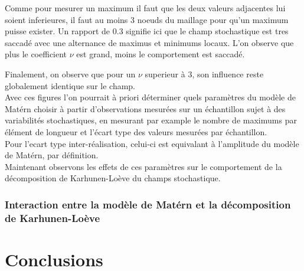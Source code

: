 \documentclass[a4paper,10pt]{article}
\begin{document}
Comme pour mesurer un maximum il faut que les deux valeurs adjacentes lui soient inferieures, il faut au moins 3 noeuds du maillage pour qu'un maximum puisse exister. Un rapport de 0.3 signifie ici que le champ stochastique est tres saccadé avec une alternance de maximus et minimums locaux. L'on observe que plus le coefficient $\nu$ est grand, moins le comportement est saccadé. \par

Finalement, on observe que pour un $\nu$ superieur à 3, son influence reste globalement identique sur le champ. \\

Avec ces figures l'on pourrait à priori déterminer quels paramètres du modèle de Matérn choisir à partir d'observations mesurées sur un échantillon sujet à des variabilités stochastiques, en mesurant par example le nombre de maximums par élément de longueur et l'écart type des valeurs mesurées par échantillon. \\ 

Pour l'ecart type inter-réalisation, celui-ci est equivalant à l'amplitude du modèle de Matérn, par définition.  \\

Maintenant observons les effets de ces paramètres sur le comportement de la décomposition de Karhunen-Loève du champs stochastique. 

\subsubsection{Interaction entre la modèle de Matérn et la décomposition de Karhunen-Loève}







\section{Conclusions}




\appendix 
\appendixpage
\addappheadtotoc
\end{document}
